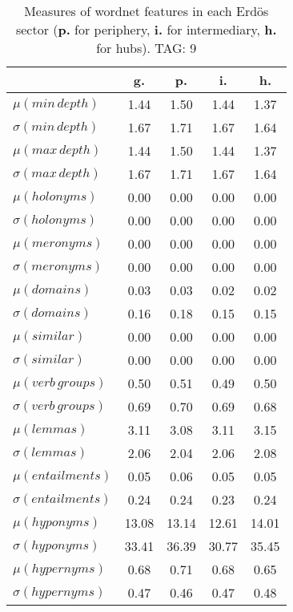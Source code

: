 \begin{table}[h!]
\begin{center}
\begin{tabular}{| l | c | c | c | c |}\hline
 & g. & p. & i. & h. \\\hline
$\mu(min\,depth)$ & 1.44  & 1.50  & 1.44  & 1.37 \\\hline
$\sigma(min\,depth)$ & 1.67  & 1.71  & 1.67  & 1.64 \\\hline
$\mu(max\,depth)$ & 1.44  & 1.50  & 1.44  & 1.37 \\\hline
$\sigma(max\,depth)$ & 1.67  & 1.71  & 1.67  & 1.64 \\\hline
$\mu(holonyms)$ & 0.00  & 0.00  & 0.00  & 0.00 \\\hline
$\sigma(holonyms)$ & 0.00  & 0.00  & 0.00  & 0.00 \\\hline
$\mu(meronyms)$ & 0.00  & 0.00  & 0.00  & 0.00 \\\hline
$\sigma(meronyms)$ & 0.00  & 0.00  & 0.00  & 0.00 \\\hline
$\mu(domains)$ & 0.03  & 0.03  & 0.02  & 0.02 \\\hline
$\sigma(domains)$ & 0.16  & 0.18  & 0.15  & 0.15 \\\hline
$\mu(similar)$ & 0.00  & 0.00  & 0.00  & 0.00 \\\hline
$\sigma(similar)$ & 0.00  & 0.00  & 0.00  & 0.00 \\\hline
$\mu(verb\,groups)$ & 0.50  & 0.51  & 0.49  & 0.50 \\\hline
$\sigma(verb\,groups)$ & 0.69  & 0.70  & 0.69  & 0.68 \\\hline
$\mu(lemmas)$ & 3.11  & 3.08  & 3.11  & 3.15 \\\hline
$\sigma(lemmas)$ & 2.06  & 2.04  & 2.06  & 2.08 \\\hline
$\mu(entailments)$ & 0.05  & 0.06  & 0.05  & 0.05 \\\hline
$\sigma(entailments)$ & 0.24  & 0.24  & 0.23  & 0.24 \\\hline
$\mu(hyponyms)$ & 13.08  & 13.14  & 12.61  & 14.01 \\\hline
$\sigma(hyponyms)$ & 33.41  & 36.39  & 30.77  & 35.45 \\\hline
$\mu(hypernyms)$ & 0.68  & 0.71  & 0.68  & 0.65 \\\hline
$\sigma(hypernyms)$ & 0.47  & 0.46  & 0.47  & 0.48 \\\hline
\end{tabular}
\caption{Measures of wordnet features in each Erd\"os sector ({{\bf p.}} for periphery, {{\bf i.}} for intermediary, {{\bf h.}} for hubs). TAG: 9}
\end{center}
\end{table}